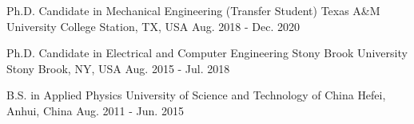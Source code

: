 

\begin{cventries}

  \cventry
    {Ph.D. Candidate in Mechanical Engineering (Transfer Student)} %
    {Texas A\&M University} %
    {College Station, TX, USA} %
    {Aug. 2018 - Dec. 2020} %
    {}

  \cventry
    {Ph.D. Candidate in Electrical and Computer Engineering} %
    {Stony Brook University} %
    {Stony Brook, NY, USA} %
    {Aug. 2015 - Jul. 2018} %
    {}

  \cventry
    {B.S. in Applied Physics} %
    {University of Science and Technology of China} %
    {Hefei, Anhui, China} %
    {Aug. 2011 - Jun. 2015} %
    {}

\end{cventries}
